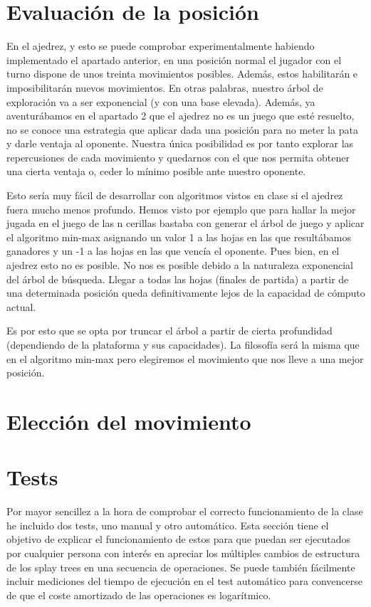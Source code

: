 \documentclass[letterpaper,12pt]{article}
\begin{document}
\section{Evaluación de la posición}

En el ajedrez, y esto se puede comprobar experimentalmente habiendo implementado el
apartado anterior, en una posición normal el jugador con el turno dispone de unos treinta
movimientos posibles. Además, estos habilitarán e imposibilitarán nuevos movimientos.
En otras palabras, nuestro árbol de exploración va a ser exponencial (y con una base
elevada). Además, ya aventurábamos en el apartado 2 que el ajedrez no es un juego que 
esté resuelto, no se conoce una estrategia que aplicar dada una posición para no meter
la pata y darle ventaja al oponente. Nuestra única posibilidad es por tanto explorar
las repercusiones de cada movimiento y quedarnos con el que nos permita obtener una 
cierta ventaja o, ceder lo mínimo posible ante nuestro oponente.

Esto sería muy fácil de desarrollar con algoritmos vistos en clase si el ajedrez fuera
mucho menos profundo. Hemos visto por ejemplo que para hallar la mejor jugada en el juego
de las n cerillas bastaba con generar el árbol de juego y aplicar el algoritmo min-max
asignando un valor 1 a las hojas en las que resultábamos ganadores y un -1 a las hojas en
las que vencía el oponente. Pues bien, en el ajedrez esto no es posible. No nos es posible
debido a la naturaleza exponencial del árbol de búsqueda. Llegar a todas las hojas (finales
de partida) a partir de una determinada posición queda definitivamente lejos de la 
capacidad de cómputo actual.

Es por esto que se opta por truncar el árbol a partir de cierta profundidad (dependiendo
de la plataforma y sus capacidades). La filosofía será la misma que en el algoritmo min-max
pero elegiremos el movimiento que nos lleve a una mejor posición.

\section{Elección del movimiento}


\appendix
\section{Tests}
Por mayor sencillez a la hora de comprobar el correcto funcionamiento de la 
clase he incluido dos tests, uno manual y otro automático. Esta sección tiene
el objetivo de explicar el funcionamiento de estos para que puedan ser 
ejecutados por cualquier persona con interés en apreciar los múltiples cambios
de estructura de los splay trees en una secuencia de operaciones. Se puede
también fácilmente incluir mediciones del tiempo de ejecución en el test 
automático para convencerse de que el coste amortizado de las operaciones es 
logarítmico.
\end{document}

